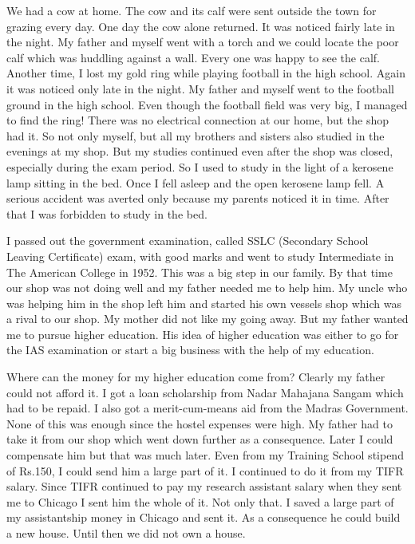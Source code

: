We had a cow at home. The cow and its calf were sent outside the town 
for grazing every day. One day the cow alone returned. It was noticed 
fairly late in the night. My father and myself went with a torch and we 
could locate the poor calf which was hudd\-ling against a wall. Every one 
was happy to see the calf.
\vskip 1pt
Another time, I lost my gold ring while playing football in the high 
school. Again it was noticed only late in the night. My father and 
myself went to the football ground in the high school. Even though the 
football field was very big, I managed to find the ring!
\vskip 1pt
There was no electrical connection at our home, but the shop had it. So 
not only myself, but all my brothers and sisters also studied in the 
evenings at my shop. But my studies\- continued even after the shop was 
closed, especially during the exam period. So I used to study in the 
light of a kerosene lamp sitting in the bed. Once I fell asleep and the 
open kerosene lamp fell. A serious accident was averted only because my 
parents noticed it in time. After that I was forbidden to study in the 
bed.

I passed out the government examination, called SSLC (Se\-condary School 
Leaving Certificate) exam, with good marks and went to study 
Intermediate in The American College in 1952. This was a big step in our 
family. By that time our shop was not doing well and my father needed me 
to help him. My uncle who was helping him in the shop left him and 
started his own vessels shop which was a rival to our shop. My mother 
did not like my going away. But my father wanted me to pursue higher 
education. His idea of higher education was either to go for the IAS 
examination or start a big business with the help of my edu\-cation.

Where can the money for my higher education come from? Clearly my father 
could not afford it. I got a loan scholar\-ship from Nadar Mahajana Sangam 
which had to be repaid. I also got a merit-cum-means aid from the Madras 
Government. None of this was enough since the hostel expenses were high. 
My father had to take it from our shop which went down further as a 
consequence. Later I could compensate him but that was much later. Even 
from my Training School stipend of Rs.150, I could send him a large part 
of it. I continued to do it from my TIFR salary. Since TIFR continued to 
pay my research assistant salary when they sent me to Chicago I sent him 
the whole of it. Not only that. I saved a large part of my assistantship 
money in Chicago and sent it. As a consequence he could build a new 
house. Until then we did not own a house.

